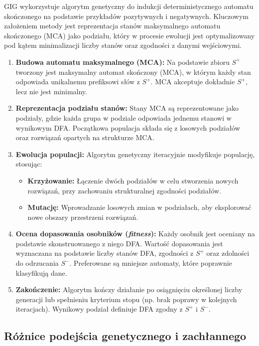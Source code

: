 GIG wykorzystuje algorytm genetyczny do indukcji deterministycznego automatu skończonego na podstawie przykładów pozytywnych i negatywnych. Kluczowym założeniem metody jest reprezentacja stanów maksymalnego automatu skończonego (MCA) jako podziału, który w procesie ewolucji jest optymalizowany pod kątem minimalizacji liczby stanów oraz zgodności z danymi wejściowymi.
\begin{enumerate}
    \item \textbf{Budowa automatu maksymalnego (MCA):}
        Na podstawie zbioru \( S^+ \) tworzony jest maksymalny automat skończony (MCA), w którym każdy stan odpowiada unikalnemu prefiksowi słów z \( S^+ \). MCA akceptuje dokładnie \( S^+ \), lecz nie jest minimalny.
    \item \textbf{Reprezentacja podziału stanów:}
        Stany MCA są reprezentowane jako podziały, gdzie każda grupa w podziale odpowiada jednemu stanowi w wynikowym DFA. Początkowa populacja składa się z losowych podziałów oraz rozwiązań opartych na strukturze MCA.
    \item \textbf{Ewolucja populacji:}
        Algorytm genetyczny iteracyjnie modyfikuje populację, stosując:
        \begin{itemize}
            \item \textbf{Krzyżowanie:} Łączenie dwóch podziałów w celu stworzenia nowych rozwiązań, przy zachowaniu strukturalnej zgodności podziałów.
            \item \textbf{Mutację:} Wprowadzanie losowych zmian w podziałach, aby eksplorować nowe obszary przestrzeni rozwiązań.
        \end{itemize}
    \item \textbf{Ocena dopasowania osobników (\textit{fitness}):}
        Każdy osobnik jest oceniany na podstawie skonstruowanego z niego DFA. Wartość dopasowania jest wyznaczana na podstawie liczby stanów DFA, zgodności z \( S^+ \) oraz zdolności do odrzucania \( S^- \). Preferowane są mniejsze automaty, które poprawnie klasyfikują dane.
    \item \textbf{Zakończenie:}
        Algorytm kończy działanie po osiągnięciu określonej liczby generacji lub spełnieniu kryterium stopu (np. brak poprawy w kolejnych iteracjach). Wynikowy podział definiuje DFA zgodny z \( S^+ \) i \( S^- \).
\end{enumerate}

\subsection{Różnice podejścia genetycznego i zachłannego}

